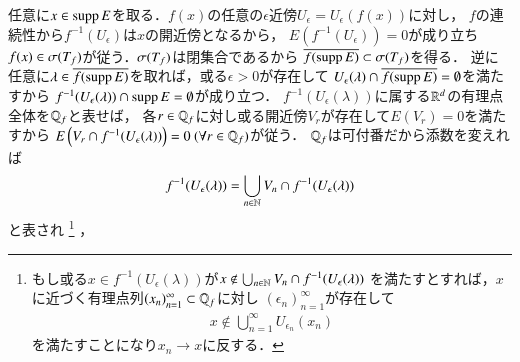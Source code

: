	\begin{prf}
		任意に$x \in \operatorname{supp} E$を取る．$f(x)$の任意の$\epsilon$近傍$U_\epsilon = U_\epsilon(f(x))$に対し，
		$f$の連続性から$f^{-1}(U_\epsilon)$は$x$の開近傍となるから，
		$E(f^{-1}(U_\epsilon)) = 0$が成り立ち$f(x) \in \mathfrak{\sigma} (T_f)$が従う．$\mathfrak{\sigma} (T_f)$は閉集合であるから
		$\overline{f(\operatorname{supp} E)} \subset \mathfrak{\sigma} (T_f)$を得る．
		逆に任意に$\lambda \in \overline{f(\operatorname{supp} E)}$を取れば，或る$\epsilon > 0$が存在して
		$U_\epsilon(\lambda) \cap \overline{f(\operatorname{supp} E)} = \emptyset$を満たすから
		$f^{-1}(U_\epsilon(\lambda)) \cap \operatorname{supp} E = \emptyset$が成り立つ．
		$f^{-1}(U_\epsilon(\lambda))$に属する$\mathbb{R}^d$の有理点全体を$\mathbb{Q}_f$と表せば，
		各$r \in \mathbb{Q}_f$に対し或る開近傍$V_r$が存在して$E(V_r) = 0$を満たすから
		$E\left( V_r \cap f^{-1}(U_\epsilon(\lambda)) \right) = 0\ (\forall r \in \mathbb{Q}_f)$が従う．
		$\mathbb{Q}_f$は可付番だから添数を変えれば
		\begin{align}
			f^{-1}(U_\epsilon(\lambda)) = \bigcup_{n \in \mathbb{N}} V_n \cap f^{-1}(U_\epsilon(\lambda))
		\end{align}
		と表され
		\footnote{
			もし或る$x \in f^{-1}(U_\epsilon(\lambda))$が$x \notin \bigcup_{n \in \mathbb{N}} V_n \cap f^{-1}(U_\epsilon(\lambda))$
			を満たすとすれば，$x$に近づく有理点列$(x_n)_{n=1}^{\infty} \subset \mathbb{Q}_f$に対し
			$(\epsilon_n)_{n=1}^{\infty}$が存在して
			\begin{align}
				x \notin \bigcup_{n=1}^{\infty} U_{\epsilon_n}(x_n)
			\end{align}
			を満たすことになり$x_n \longrightarrow x$に反する．
		}
		，
	\end{prf}